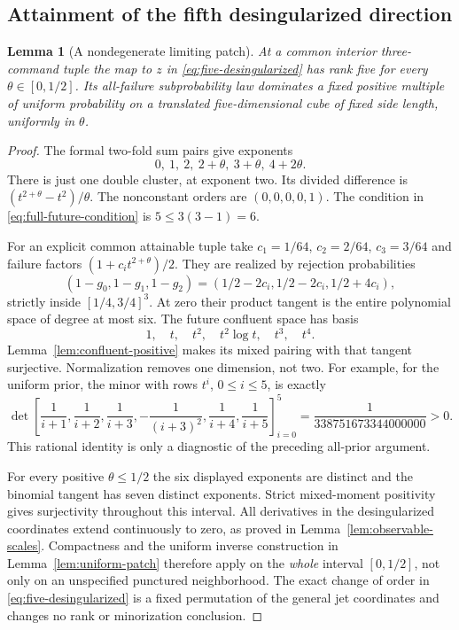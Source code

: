 \documentclass[11pt]{amsart}
\newtheorem{lemma}[theorem]{Lemma}
\theoremstyle{definition}\newtheorem{definition}[theorem]{Definition}
\theoremstyle{remark}\newtheorem{remark}[theorem]{Remark}
\begin{document}
\subsection{Attainment of the fifth desingularized direction}
\begin{lemma}[A nondegenerate limiting patch]\label{lem:five-patch}
At a common interior three-command tuple the map to $z$ in
\eqref{eq:five-desingularized} has rank five for every $\theta\in[0,1/2]$.
Its all-failure subprobability law dominates a fixed positive multiple of
uniform probability on a translated five-dimensional cube of fixed side
length, uniformly in $\theta$.
\end{lemma}
\begin{proof}
The formal two-fold sum pairs give exponents
\[
 0,\ 1,\ 2,\ 2+\theta,\ 3+\theta,\ 4+2\theta.
\]
There is just one double cluster, at exponent two. Its divided difference
is $(t^{2+\theta}-t^2)/\theta$. The nonconstant orders are
$(0,0,0,0,1)$. The condition in \eqref{eq:full-future-condition} is
$5\le3(3-1)=6$.

For an explicit common attainable tuple take
$c_1=1/64$, $c_2=2/64$, $c_3=3/64$ and failure factors
$(1+c_it^{2+\theta})/2$. They are realized by rejection probabilities
\[
 (1-g_0,1-g_1,1-g_2)
       =(1/2-2c_i,1/2-2c_i,1/2+4c_i),
\]
strictly inside $[1/4,3/4]^3$. At zero their product tangent is the
entire polynomial space of degree at most six. The future confluent
space has basis
\[
 1,\quad t,\quad t^2,\quad t^2\log t,\quad t^3,\quad t^4.
\]
Lemma~\ref{lem:confluent-positive} makes its mixed pairing with that
tangent surjective. Normalization removes one dimension, not two.
For example, for the uniform prior, the minor with rows $t^i$,
$0\le i\le5$, is exactly
\begin{equation}\label{eq:confluent-exact-minor}
 \det\left[
 \frac1{i+1},\frac1{i+2},\frac1{i+3},
 -\frac1{(i+3)^2},\frac1{i+4},\frac1{i+5}
       \right]_{i=0}^{5}
       =\frac1{338751673344000000}>0.
\end{equation}
This rational identity is only a diagnostic of the preceding all-prior
argument.

For every positive $\theta\le1/2$ the six displayed exponents are distinct
and the binomial tangent has seven distinct exponents. Strict mixed-moment
positivity gives surjectivity throughout this interval. All derivatives
in the desingularized coordinates extend continuously to zero, as proved
in Lemma~\ref{lem:observable-scales}. Compactness and the uniform inverse
construction in Lemma~\ref{lem:uniform-patch} therefore apply on the
\emph{whole} interval $[0,1/2]$, not only on an unspecified punctured
neighborhood. The exact change of order in \eqref{eq:five-desingularized}
is a fixed permutation of the general jet coordinates and changes no
rank or minorization conclusion.
\end{proof}
\end{document}
